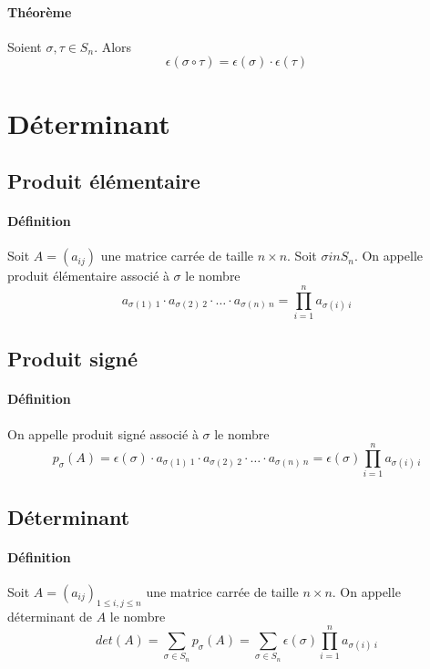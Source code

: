 \paragraph{Théorème} Soient $\sigma, \tau \in S_n$. Alors
$$\epsilon(\sigma \circ \tau) = \epsilon(\sigma) \cdot \epsilon(\tau)$$

%
%
\section{Déterminant}
%
%

%
\subsection{Produit élémentaire}
%
\paragraph{Définition} Soit $A = (a_{ij})$ une matrice carrée de taille $n\times n$. Soit $\sigma in S_n$. On appelle produit élémentaire associé à $\sigma$ le nombre
$$a_{\sigma(1) ~ 1} \cdot a_{\sigma(2) ~ 2} \cdot \ldots \cdot a_{\sigma(n) ~ n} = \prod_{i=1}^{n} a_{\sigma(i) ~ i}$$
%
\subsection{Produit signé}
%
\paragraph{Définition} On appelle produit signé associé à $\sigma$ le nombre 
$$p_{\sigma}(A) = \epsilon(\sigma) \cdot a_{\sigma(1) ~ 1} \cdot a_{\sigma(2) ~ 2} \cdot \ldots \cdot a_{\sigma(n) ~ n} = \epsilon(\sigma) \prod_{i=1}^{n} a_{\sigma(i) ~ i}$$

%
\subsection{Déterminant}
%
\paragraph{Définition} Soit $A = (a_{ij})_{1 \leq i, j \leq n}$ une matrice carrée de taille $n \times n$. On appelle déterminant de $A$ le nombre
$$det(A) = \sum_{\sigma \in S_n} p_{\sigma}(A) = \sum_{\sigma \in S_n} \epsilon(\sigma) \prod_{i=1}^{n} a_{\sigma(i) ~ i}$$

